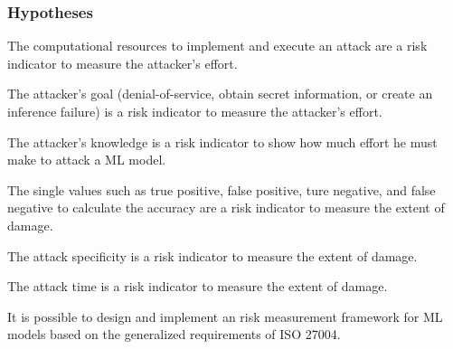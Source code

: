 \subsubsection*{Hypotheses}


\begin{hypotheses}
  \item The computational resources to implement and execute an attack are a risk indicator to measure the attacker's effort. \label{itm:h1}
  \item The attacker's goal (denial-of-service, obtain secret information, or create an inference failure) is a risk indicator to measure the attacker's effort. \label{itm:h2}
  \item The attacker's knowledge is a risk indicator to show how much effort he must make to attack a ML model. \label{itm:h3}
  \item The single values such as true positive, false positive, ture negative, and false negative to calculate the accuracy are a risk indicator to measure the extent of damage. \label{itm:h4}
  \item The attack specificity is a risk indicator to measure the extent of damage. \label{itm:h5}
  \item The attack time is a risk indicator to measure the extent of damage. \label{itm:h6}
  \item It is possible to design and implement an risk measurement framework for ML models based on the generalized requirements of ISO 27004. \label{itm:h7}
\end{hypotheses}
